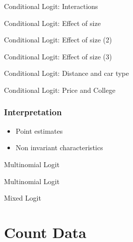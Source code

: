 \documentclass{beamer}
\newcommand{\1}{\mathbb{1}}
\begin{document}
\begin{frame}{Conditional Logit: Interactions}

\end{frame}

\begin{frame}{Conditional Logit: Effect of size}

\end{frame}

\begin{frame}{Conditional Logit: Effect of size (2)}

\end{frame}

\begin{frame}{Conditional Logit: Effect of size (3)}

\end{frame}

\begin{frame}{Conditional Logit: Distance and car type}

\end{frame}

\begin{frame}{Conditional Logit: Price and College}

\end{frame}


\begin{frame}\frametitle{Interpretation}
\begin{itemize}
 \item Point estimates
 \item Non invariant characteristics
\end{itemize}
\end{frame}

\begin{frame}{Multinomial Logit}

\end{frame}

\begin{frame}{Multinomial Logit}

\end{frame}

\begin{frame}{Mixed Logit}

\end{frame}


\section{Count Data}

\begin{frame}
\tableofcontents[currentsection] 
\end{frame}
\end{document}
